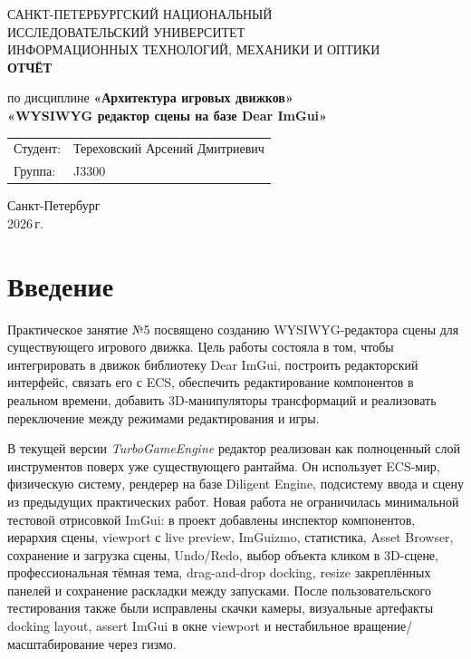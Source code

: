 \documentclass[a4paper,14pt]{extarticle}
\begin{document}
\begin{titlepage}
\begin{center}
\large
САНКТ-ПЕТЕРБУРГСКИЙ НАЦИОНАЛЬНЫЙ\\
ИССЛЕДОВАТЕЛЬСКИЙ УНИВЕРСИТЕТ\\
ИНФОРМАЦИОННЫХ ТЕХНОЛОГИЙ, МЕХАНИКИ И ОПТИКИ\\

\vfill
\textbf{ОТЧЁТ}\par
по дисциплине \textbf{«Архитектура игровых движков»}\\[2mm]
\textbf{«WYSIWYG редактор сцены на базе Dear ImGui»}\\[10mm]

\vfill
\begin{flushright}
\begin{tabular}{@{}l@{\quad}l@{}}
Студент: & Тереховский Арсений Дмитриевич\\
Группа: & J3300\\
\end{tabular}
\end{flushright}

\vfill
Санкт-Петербург\\
2026\,г.
\end{center}
\end{titlepage}

\newpage
{}
\setcounter{page}{2}
\tableofcontents
\newpage

\section{Введение}
Практическое занятие №5 посвящено созданию WYSIWYG-редактора сцены для существующего игрового движка. Цель работы состояла в том, чтобы интегрировать в движок библиотеку Dear ImGui, построить редакторский интерфейс, связать его с ECS, обеспечить редактирование компонентов в реальном времени, добавить 3D-манипуляторы трансформаций и реализовать переключение между режимами редактирования и игры.

В текущей версии \textit{TurboGameEngine} редактор реализован как полноценный слой инструментов поверх уже существующего рантайма. Он использует ECS-мир, физическую систему, рендерер на базе Diligent Engine, подсистему ввода и сцену из предыдущих практических работ. Новая работа не ограничилась минимальной тестовой отрисовкой ImGui: в проект добавлены инспектор компонентов, иерархия сцены, viewport с live preview, ImGuizmo, статистика, Asset Browser, сохранение и загрузка сцены, Undo/Redo, выбор объекта кликом в 3D-сцене, профессиональная тёмная тема, drag-and-drop docking, resize закреплённых панелей и сохранение раскладки между запусками. После пользовательского тестирования также были исправлены скачки камеры, визуальные артефакты docking layout, assert ImGui в окне viewport и нестабильное вращение/масштабирование через гизмо.
\end{document}
